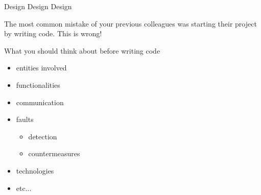 \documentclass[presentation]{beamer}\mode<presentation>{\usetheme{AMSBolognaFC}}
\begin{document}
\begin{frame}[c,allowframebreaks]{Design Design Design}
    

    The most common mistake of your previous colleagues was starting their project by writing code.
    \alert{This is wrong!}
   
     \begin{block}{What you should think about before writing code}
        \begin{itemize}
            \item entities involved
            \item functionalities
            \item communication
            \item \alert{faults}
            \begin{itemize}
                \item detection
                \item countermeasures
            \end{itemize}
            \item technologies
            \item etc...
        \end{itemize}
    \end{block}
    

\end{frame}
\end{document}
